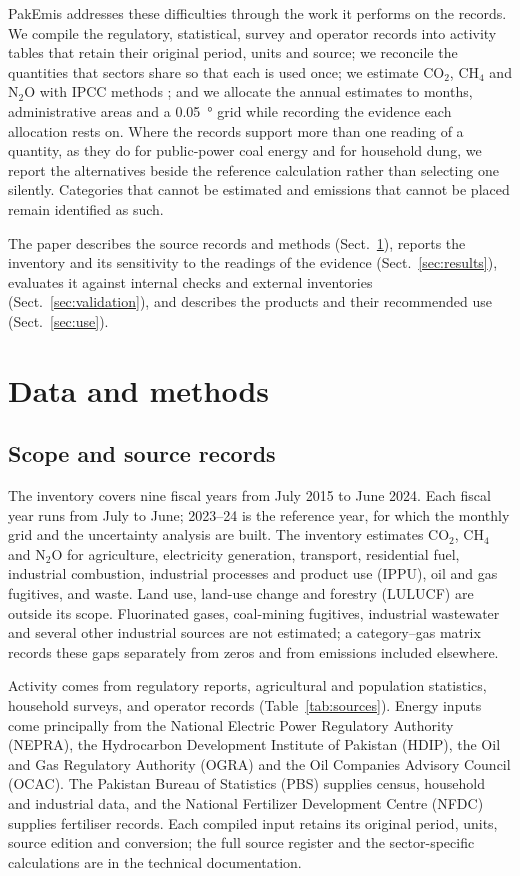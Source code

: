 \documentclass[essd,manuscript]{copernicus}
\begin{document}
PakEmis addresses these difficulties through the work it performs on the records. We compile the regulatory, statistical, survey and operator records into activity tables that retain their original period, units and source; we reconcile the quantities that sectors share so that each is used once; we estimate CO$_2$, CH$_4$ and N$_2$O with IPCC methods \citep{IPCC2006,IPCC2019}; and we allocate the annual estimates to months, administrative areas and a \SI{0.05}{\degree} grid while recording the evidence each allocation rests on. Where the records support more than one reading of a quantity, as they do for public-power coal energy and for household dung, we report the alternatives beside the reference calculation rather than selecting one silently. Categories that cannot be estimated and emissions that cannot be placed remain identified as such.

The paper describes the source records and methods (Sect.~\ref{sec:methods}), reports the inventory and its sensitivity to the readings of the evidence (Sect.~\ref{sec:results}), evaluates it against internal checks and external inventories (Sect.~\ref{sec:validation}), and describes the products and their recommended use (Sect.~\ref{sec:use}).

\section{Data and methods}
\label{sec:methods}

\subsection{Scope and source records}
\label{sec:scope}

The inventory covers nine fiscal years from July 2015 to June 2024. Each fiscal year runs from July to June; 2023--24 is the reference year, for which the monthly grid and the uncertainty analysis are built. The inventory estimates CO$_2$, CH$_4$ and N$_2$O for agriculture, electricity generation, transport, residential fuel, industrial combustion, industrial processes and product use (IPPU), oil and gas fugitives, and waste. Land use, land-use change and forestry (LULUCF) are outside its scope. Fluorinated gases, coal-mining fugitives, industrial wastewater and several other industrial sources are not estimated; a category--gas matrix records these gaps separately from zeros and from emissions included elsewhere.

Activity comes from regulatory reports, agricultural and population statistics, household surveys, and operator records (Table~\ref{tab:sources}). Energy inputs come principally from the National Electric Power Regulatory Authority (NEPRA), the Hydrocarbon Development Institute of Pakistan (HDIP), the Oil and Gas Regulatory Authority (OGRA) and the Oil Companies Advisory Council (OCAC). The Pakistan Bureau of Statistics (PBS) supplies census, household and industrial data, and the National Fertilizer Development Centre (NFDC) supplies fertiliser records. Each compiled input retains its original period, units, source edition and conversion; the full source register and the sector-specific calculations are in the technical documentation.
\end{document}

